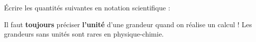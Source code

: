 \numeroQuestion Écrire les quantités suivantes en notation scientifique : \\[8pt]

\attention Il faut \textbf{toujours} préciser \textbf{l'unité} d'une grandeur quand on réalise un calcul !
Les grandeurs sans unités sont rares en physique-chimie.


